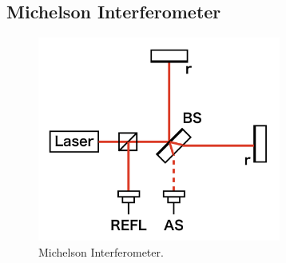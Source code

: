 \subsection{Michelson Interferometer} \label{sec:121}
\begin{figure}[h]
  \begin{center}   
    \includegraphics[width=8.0cm]{./img_chap1/img132.png}
    \caption{Michelson Interferometer. }\label{img:img132}
  \end{center}
\end{figure}

